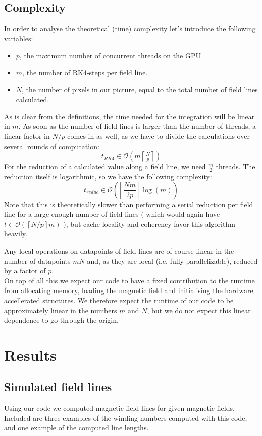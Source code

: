 \documentclass[a4paper]{article}
\renewcommand{\O}[1]{\ensuremath{\mathcal{O}\left(#1\right)}}
\begin{document}
\subsection{Complexity}
In order to analyse the theoretical (time) complexity let's introduce the following variables:
\begin{itemize}
	\item $p$, the maximum number of concurrent threads on the GPU
	\item $m$, the number of RK4-steps per field line.
	\item $N$, the number of pixels in our picture, equal to the total number of field lines calculated.
\end{itemize}
As is clear from the definitions, the time needed for the integration will be linear in $m$. As soon as the number of field lines is larger than the number of threads, a linear factor in $N/p$ comes in as well, as we have to divide the calculations over several rounds of computation:
\[t_{RK4}\in\O{m\left\lceil\tfrac{N}{p}\right\rceil}\]
For the reduction of a calculated value along a field line, we need $\frac m2$ threads. The reduction itself is logarithmic, so we have the following complexity:
\[t_\textit{reduc} \in \O{\left\lceil\frac{Nm}{2p}\right\rceil\log\left(m\right)} \]
Note that this is theoretically slower than performing a serial reduction per field line for a large enough number of field lines ( which would again have $t \in \O{\left\lceil N/p\right\rceil m}$ ), but cache locality and coherency favor this algorithm heavily.

Any local operations on datapoints of field lines are of course linear in the number of datapoints $mN$ and, as they are local (i.e. fully parallelizable), reduced by a factor of $p$.\\
On top of all this we expect our code to have a fixed contribution to the runtime from allocating memory, loading the magnetic field and initialising the hardware accellerated structures. We therefore expect the runtime of our code to be approximately linear in the numbers $m$ and $N$, but we do not expect this linear dependence to go through the origin.

\section{Results}
\subsection{Simulated field lines}
Using our code we computed magnetic field lines for given magnetic fields. Included are three examples of the winding numbers computed with this code, and one example of the computed line lengths.
\end{document}

